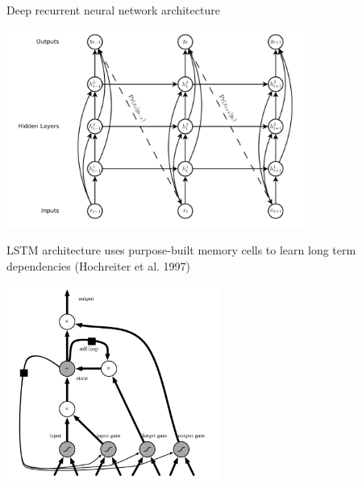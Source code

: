 \documentclass[envcountsect]{beamer}
\begin{document}
\begin{frame}{Deep recurrent neural network architecture}

\begin{center}
\includegraphics[width=10cm]{./imag/architecture.png}
\end{center}


\end{frame}

\begin{frame}{LSTM architecture uses purpose-built memory cells to learn long term dependencies (Hochreiter et al. 1997)}
\begin{center}
\includegraphics[width=7cm]{./imag/lstm.png}
\end{center}
\end{frame}
\end{document}
